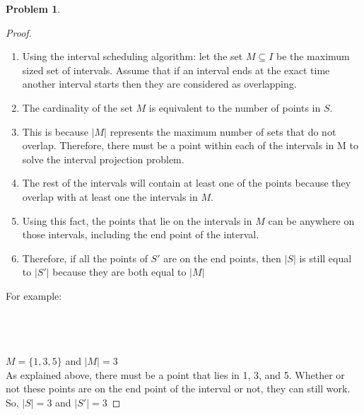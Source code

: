 \documentclass[11pt]{article}
\theoremstyle{definition}
\theoremstyle{definition}
\newtheorem{required}{Problem}
\theoremstyle{definition}
\newcommand{\interval}[4]{\draw (#2, #1) -- (#3, #1); %
\draw (#2, #1-0.11) -- (#2, #1+0.11); %
\draw (#3, #1-0.11) -- (#3, #1+0.11); %
\node[] at (#2-0.25, #1) {#4};
}
\begin{document}
\begin{required}
\begin{enumerate}[label=(\alph*)]
\begin{proof}
\begin{enumerate}
    \item Using the interval scheduling algorithm: let the set $M \subseteq I$ be the maximum sized set of intervals. Assume that if an interval ends at the exact time another interval starts then they are considered as overlapping. 
    \item The cardinality of the set $M$ is equivalent to the number of points in $S$.
    \item This is because $|M|$ represents the maximum number of sets that do not overlap. Therefore, there must be a point within each of the intervals in M to solve the interval projection problem. 
    \item The rest of the intervals will contain at least one of the points because they overlap with at least one the intervals in $M$.
    \item Using this fact, the points that lie on the intervals in $M$ can be anywhere on those intervals, including the end point of the interval.
    \item Therefore, if all the points of $S'$ are on the end points, then $|S|$ is still equal to $|S'|$ because they are both equal to $|M|$ 
\end{enumerate}

For example: \\ \\
 \\ \\
$M = \{1,3,5\}$ and $|M| = 3$ \\
As explained above, there must be a point that lies in 1, 3, and 5. Whether or not these points are on the end point of the interval or not, they can still work. So, $|S| = 3$ and $|S'| = 3$

\end{proof}

\end{enumerate}
\end{required}
 
\end{document}

